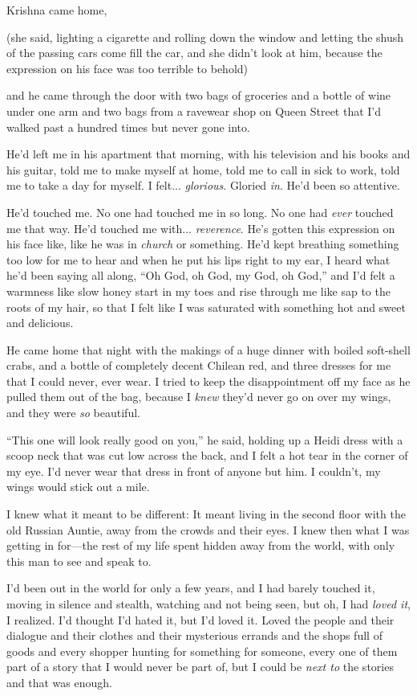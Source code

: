 \documentclass{article}
\begin{document}
Krishna came home,

(she said, lighting a cigarette and rolling down the window and
letting the shush of the passing cars come fill the car, and she
didn't look at him, because the expression on his face was too
terrible to behold)

and he came through the door with two bags of groceries and a bottle
of wine under one arm and two bags from a ravewear shop on Queen
Street that I'd walked past a hundred times but never gone into.

He'd left me in his apartment that morning, with his television and
his books and his guitar, told me to make myself at home, told me to
call in sick to work, told me to take a day for myself.  I felt... 
\textit{glorious}.  Gloried \textit{in}.  He'd been so attentive.

He'd touched me.  No one had touched me in so long.  No one had
\textit{ever} touched me that way.  He'd touched me with... 
\textit{reverence}.  He's gotten this expression on his face like,
like he was in \textit{church} or something.  He'd kept breathing
something too low for me to hear and when he put his lips right to my
ear, I heard what he'd been saying all along, ``Oh God, oh God, my
God, oh God,'' and I'd felt a warmness like slow honey start in my
toes and rise through me like sap to the roots of my hair, so that I
felt like I was saturated with something hot and sweet and delicious.

He came home that night with the makings of a huge dinner with boiled
soft-shell crabs, and a bottle of completely decent Chilean red, and
three dresses for me that I could never, ever wear.  I tried to keep
the disappointment off my face as he pulled them out of the bag,
because I \textit{knew} they'd never go on over my wings, and they
were \textit{so} beautiful.

``This one will look really good on you,'' he said, holding up a Heidi
dress with a scoop neck that was cut low across the back, and I felt a
hot tear in the corner of my eye.  I'd never wear that dress in front
of anyone but him.  I couldn't, my wings would stick out a mile.

I knew what it meant to be different:  It meant living in the second
floor with the old Russian Auntie, away from the crowds and their
eyes.  I knew then what I was getting in for---the rest of my life
spent hidden away from the world, with only this man to see and speak
to.

I'd been out in the world for only a few years, and I had barely
touched it, moving in silence and stealth, watching and not being
seen, but oh, I had \textit{loved it}, I realized.  I'd thought I'd
hated it, but I'd loved it.  Loved the people and their dialogue and
their clothes and their mysterious errands and the shops full of goods
and every shopper hunting for something for someone, every one of them
part of a story that I would never be part of, but I could be
\textit{next to} the stories and that was enough.
\end{document}
